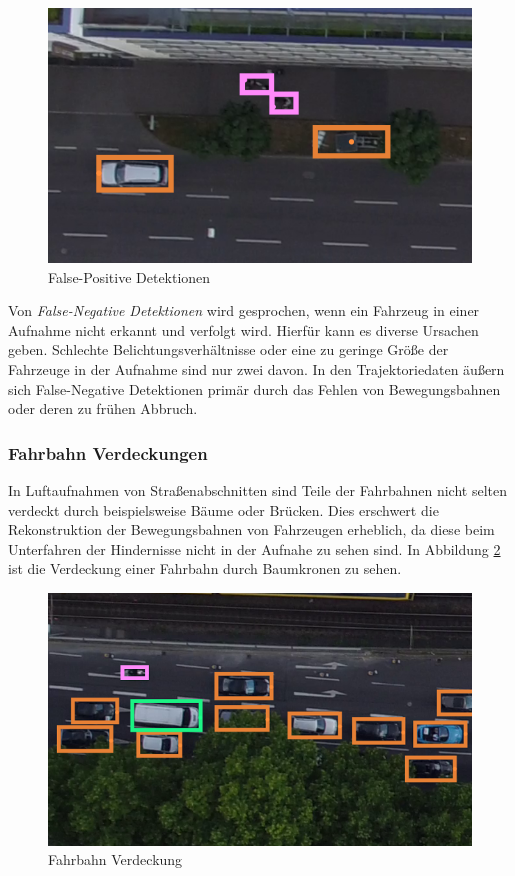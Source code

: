 \begin{figure}[H]
    \centering
    \includegraphics[width=0.45\linewidth]{resources/img/grundlagen/TrajectoryReconstruction/challenges/False-Positives}
    \caption{False-Positive Detektionen}
    \label{fig:grund_false_positive_detections}
\end{figure}

Von \textit{False-Negative Detektionen} wird gesprochen, wenn ein Fahrzeug in einer Aufnahme nicht
erkannt und verfolgt wird. Hierfür kann es diverse Ursachen geben. Schlechte Belichtungsverhältnisse
oder eine zu geringe Größe der Fahrzeuge in der Aufnahme sind nur zwei davon.
In den Trajektoriedaten äußern sich False-Negative Detektionen primär durch das Fehlen von Bewegungsbahnen
oder deren zu frühen Abbruch.

\subsubsection*{Fahrbahn Verdeckungen}

In Luftaufnahmen von Straßenabschnitten sind Teile der Fahrbahnen nicht selten verdeckt durch beispielsweise
Bäume oder Brücken. Dies erschwert die Rekonstruktion der Bewegungsbahnen von Fahrzeugen erheblich, da diese
beim Unterfahren der Hindernisse nicht in der Aufnahe zu sehen sind. In Abbildung \ref{fig:grund_lane_occlusion}
ist die Verdeckung einer Fahrbahn durch Baumkronen zu sehen.

\begin{figure}[H]
    \centering
    \includegraphics[width=0.45\linewidth]{resources/img/grundlagen/TrajectoryReconstruction/challenges/Verdeckung}
    \caption{Fahrbahn Verdeckung}
    \label{fig:grund_lane_occlusion}
\end{figure}

